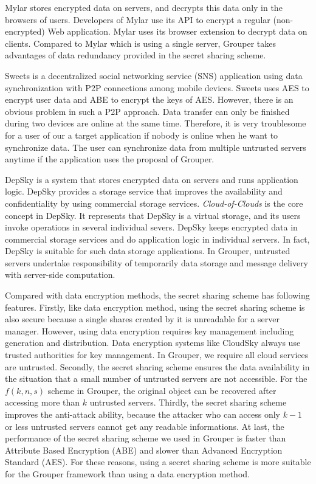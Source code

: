 \documentclass[twocolumn,10pt]{article}
\begin{document}
Mylar stores encrypted data on servers, and decrypts this data only in the browsers of users. 
Developers of Mylar use its API to encrypt a regular (non-encrypted) Web application. 
Mylar uses its browser extension to decrypt data on clients. 
Compared to Mylar which is using a single server, Grouper takes advantages of data redundancy provided in the secret sharing scheme.

Sweets is a decentralized social networking service (SNS) application using data synchronization with P2P connections among mobile devices. 
Sweets uses AES to encrypt user data and ABE to encrypt the keys of AES. 
However, there is an obvious problem in such a P2P approach. 
Data transfer can only be finished during two devices are online at the same time. 
Therefore, it is very troublesome for a user of our a target application if nobody is online when he want to synchronize data.
The user can synchronize data from multiple untrusted servers anytime if the application uses the proposal of Grouper.

DepSky\cite{bessani2013depsky} is a system that stores encrypted data on servers and runs application logic. 
DepSky provides a storage service that improves the availability and confidentiality by using commercial storage services. 
\emph{Cloud-of-Clouds} is the core concept in DepSky. 
It represents that DepSky is a virtual storage, and its users invoke operations in several individual severs. 
DepSky keeps encrypted data in commercial storage services and do application logic in individual servers.
In fact, DepSky is suitable for such data storage applications. 
In Grouper, untrusted servers undertake responsibility of temporarily data storage and message delivery with server-side computation.

Compared with data encryption methods, the secret sharing scheme has following features.
Firstly, like data encryption method, using the secret sharing scheme is also secure because a single shares created by it is unreadable for a server manager.
However, using data encryption requires key management including generation and distribution.
Data encryption systems like CloudSky always use trusted authorities for key management.
In Grouper, we require all cloud services are untrusted.
Secondly, the secret sharing scheme ensures the data availability in the situation that a small number of untrusted servers are not accessible.
For the $f(k, n, s)$ scheme in Grouper, the original object can be recovered after accessing more than $k$ untrusted servers.
Thirdly, the secret sharing scheme improves the anti-attack ability, because the attacker who can access only $k-1$ or less untrusted servers cannot get any readable informations.
At last, the performance of the secret sharing scheme we used in Grouper is faster than Attribute Based Encryption (ABE) and slower than Advanced Encryption Standard (AES).
For these reasons, using a secret sharing scheme is more suitable for the Grouper framework than using a data encryption method.
\end{document}
